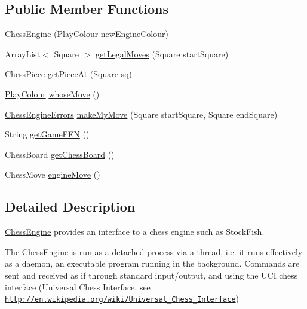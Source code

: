 \subsection*{Public Member Functions}
\begin{DoxyCompactItemize}
\item 
\hyperlink{classswantech_1_1_chess_engine_a206b7f60195b050af7bf73124a359bd5}{Chess\+Engine} (\hyperlink{enumswantech_1_1_play_colour}{Play\+Colour} new\+Engine\+Colour)
\item 
Array\+List$<$ Square $>$ \hyperlink{classswantech_1_1_chess_engine_a529858ea407075c6a4daf04d5b3dd51e}{get\+Legal\+Moves} (Square start\+Square)
\item 
Chess\+Piece \hyperlink{classswantech_1_1_chess_engine_ad09f3dd52a728a42cdb1515e7104f03e}{get\+Piece\+At} (Square sq)
\item 
\hyperlink{enumswantech_1_1_play_colour}{Play\+Colour} \hyperlink{classswantech_1_1_chess_engine_ae6976be646e833558d31d2e3bf242773}{whose\+Move} ()
\item 
\hyperlink{enumswantech_1_1_chess_engine_errors}{Chess\+Engine\+Errors} \hyperlink{classswantech_1_1_chess_engine_a0e8106f504de2a1cec26d523865c3d02}{make\+My\+Move} (Square start\+Square, Square end\+Square)
\item 
String \hyperlink{classswantech_1_1_chess_engine_a06277d63732bbc472ad1a61e0f5e5ae8}{get\+Game\+F\+E\+N} ()
\item 
Chess\+Board \hyperlink{classswantech_1_1_chess_engine_aff2e5a7749c5e48afdbe544b879454fa}{get\+Chess\+Board} ()
\item 
Chess\+Move \hyperlink{classswantech_1_1_chess_engine_a4e2edbbc872baf9bd0f180a132090584}{engine\+Move} ()
\end{DoxyCompactItemize}


\subsection{Detailed Description}
\hyperlink{classswantech_1_1_chess_engine}{Chess\+Engine} provides an interface to a chess engine such as Stock\+Fish. 

The \hyperlink{classswantech_1_1_chess_engine}{Chess\+Engine} is run as a detached process via a thread, i.\+e. it runs effectively as a daemon, an executable program running in the background. Commands are sent and received as if through standard input/output, and using the U\+C\+I chess interface (Universal Chess Interface, see \href{http://en.wikipedia.org/wiki/Universal_Chess_Interface}{\tt http\+://en.\+wikipedia.\+org/wiki/\+Universal\+\_\+\+Chess\+\_\+\+Interface}) 

